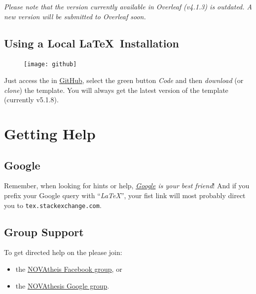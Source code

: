 \emph{Please note that the version currently available in Overleaf (v4.1.3) is outdated. A new version will be submitted to Overleaf soon.}  

\subsection{Using a Local \LaTeX\ Installation}
\label{sub:using_local_latex}

\begin{figure}
\vspace*{-15ex}\texttt{[image: github]}%
\end{figure}

Just access the  in \href{https://github.com/joaomlourenco/novathesis}{GitHub}, select the green button \emph{Code} and then \emph{download} (or \emph{clone}) the template.  You will always get the latest version of the template (currently v5.1.8).


\section{Getting Help}
\label{sec:getting_help}

\begin{center}  
\end{center}
 
\subsection{Google}
\label{sub:group_google}

Remember, when looking for hints or help, \emph{\href{google.com}{Google} is your best friend}!   And if you prefix your Google query with “\emph{LaTeX}”, your fist link will most probably direct you to \texttt{tex.stackexchange.com}.

\subsection{Group Support}
\label{sub:group_support}

To get directed help on the  please join:
\begin{itemize}
  \item the \href{https://www.facebook.com/groups/novathesis}{NOVAtheis Facebook group}, or
  \item the \href{https://groups.google.com/forum/#!forum/novathesis}{NOVAthesis Google group}.
\end{itemize}

